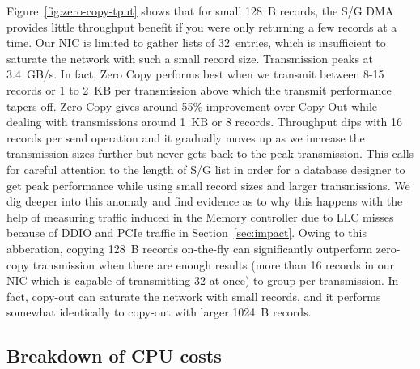 
Figure~\ref{fig:zero-copy-tput} shows that for small 128~B records, the S/G DMA
provides little throughput benefit if you were only returning a few records 
at a time. Our NIC is limited to gather lists
of 32~entries, which is insufficient to saturate the network with such a small
record size. Transmission peaks at 3.4~GB/s. In fact, Zero Copy performs best when
we transmit between 8-15 records or 1 to 2~KB per transmission above which the transmit performance 
tapers off. Zero Copy gives around 55\% improvement over Copy Out while dealing 
with transmissions around 1~KB or 8 records. Throughput dips with 16 records per send operation and it gradually moves up as we 
increase the transmission sizes further but never gets back to the peak transmission. This calls 
for careful attention to the length of S/G list in order for a database designer to get peak performance while using small record sizes and larger 
transmissions. We dig deeper into this anomaly and find evidence as to why this happens with the 
help of measuring traffic induced in the Memory controller due to LLC misses because of DDIO and 
PCIe traffic in Section~\ref{sec:impact}. Owing to this abberation, copying 128~B records 
on-the-fly can significantly outperform zero-copy transmission when there are 
enough results (more than 16 records in our NIC which is capable of transmitting 32 at once) to group per transmission.
In fact, copy-out can saturate the network with small records, and it
performs somewhat identically to copy-out with larger 1024~B records.



\subsection{Breakdown of CPU costs}
\label{sec:overhead}

